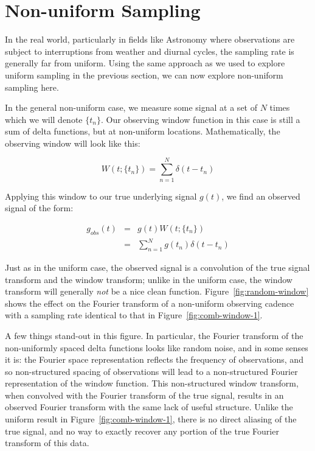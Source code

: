 \documentclass[preprint]{aastex}
\newcommand{\Fig}[1]{Figure~\ref{fig:#1}}
\newcommand{\fig}[1]{Figure~\ref{fig:#1}}
\newcommand{\eqlabel}[1]{\label{eq:#1}}
\newcommand{\sectlabel}[1]{\label{sect:#1}}
\begin{document}
\section{Non-uniform Sampling}
\sectlabel{non-uniform-sampling}

In the real world, particularly in fields like Astronomy where observations are
subject to interruptions from weather and diurnal cycles, the sampling rate
is generally far from uniform.
Using the same approach as we used to explore uniform sampling in the previous
section, we can now explore non-uniform sampling here.

In the general non-uniform case, we measure some signal at a set of $N$ times
which we will denote $\{t_n\}$.
Our observing window function in this case is still a sum of delta functions,
but at non-uniform locations.
Mathematically, the observing window will look like this:

\begin{equation}
W(t; \{t_n\}) = \sum_{n=1}^{N} \delta(t - t_n)
\end{equation}

Applying this window to our true underlying signal $g(t)$, we find an observed
signal of the form:

\begin{eqnarray}
  g_{obs}(t) &=& g(t) W(t; \{t_n\}) \nonumber\\
             &=& \sum_{n=1}^{N} g(t_n)\delta(t - t_n)
  \eqlabel{g-nonuniform}
\end{eqnarray}

Just as in the uniform case, the observed signal is a convolution of the true
signal transform and the window transform; unlike in the uniform case, the
window transform will generally {\it not} be a nice clean function.
\Fig{random-window} shows the effect on the Fourier transform of a
non-uniform observing cadence with a sampling rate identical to that
in \fig{comb-window-1}.

A few things stand-out in this figure. In particular, the Fourier transform of
the non-uniformly spaced delta functions looks like random noise, and in some
senses it is: the Fourier space representation reflects the frequency of
observations, and so non-structured spacing of observations will lead to
a non-structured Fourier representation of the window function.
This non-structured window transform, when convolved with the Fourier transform
of the true signal, results in an observed Fourier transform with the same
lack of useful structure.
Unlike the uniform result in \Fig{comb-window-1}, there is no direct aliasing
of the true signal, and no way to exactly recover any portion of the true
Fourier transform of this data.
\end{document}

